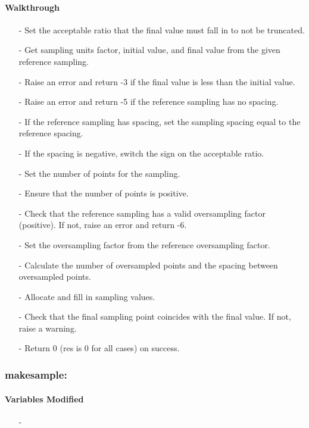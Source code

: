 \documentclass[letterpaper,12pt]{article}
\begin{document}
\paragraph{Walkthrough}
\begin{enumerate}[leftmargin=10pt, noitemsep, parsep=0pt, topsep=0ex]
\item[-] Set the acceptable ratio that the final value must fall in to not be truncated.
\item[-] Get sampling units factor, initial value, and final value from the given reference sampling.
\item[-] Raise an error and return -3 if the final value is less than the initial value.
\item[-] Raise an error and return -5 if the reference sampling has no spacing.
\item[-] If the reference sampling has spacing, set the sampling spacing equal to the reference spacing.
\item[-] If the spacing is negative, switch the sign on the acceptable ratio.
\item[-] Set the number of points for the sampling.
\item[-] Ensure that the number of points is positive.
\item[-] Check that the reference sampling has a valid oversampling factor (positive). If not, raise an error and return -6.
\item[-] Set the oversampling factor from the reference oversampling factor.
\item[-] Calculate the number of oversampled points and the spacing between oversampled points.
\item[-] Allocate and fill in sampling values.
\item[-] Check that the final sampling point coincides with the final value. If not, raise a warning.
\item[-] Return 0 (res is 0 for all cases) on success.
\end{enumerate}

\subsubsection{makesample:}
\paragraph{Variables Modified}
\begin{enumerate}[leftmargin=10pt, noitemsep, parsep=0pt, topsep=0ex]
\item[-] 
\end{enumerate}
\end{document}
